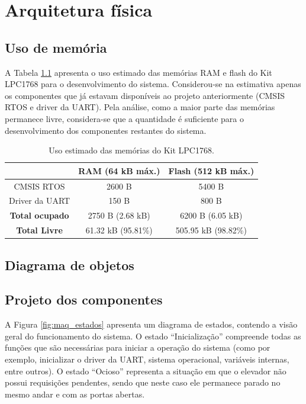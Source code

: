 \chapter{Arquitetura física}

\section{Uso de memória}

A Tabela \ref{tab:uso_memoria} apresenta o uso estimado das memórias RAM e flash do Kit LPC1768 para o desenvolvimento do sistema. Considerou-se na estimativa apenas os componentes que já estavam disponíveis ao projeto anteriormente (CMSIS RTOS e driver da UART). Pela análise, como a maior parte das memórias permanece livre, considera-se que a quantidade é suficiente para o desenvolvimento dos componentes restantes do sistema.

\begin{table}[h!]
	\caption{Uso estimado das memórias do Kit LPC1768.}
	\centering
	\begin{tabular}{|c|c|c|}
		\hline
		\textbf{} &\textbf{RAM (64 kB máx.)} & \textbf{Flash (512 kB máx.)} \\ \hline \hline
		CMSIS RTOS & 2600 B & 5400 B\\
		Driver da UART & 150 B & 800 B\\
		\hline
		\bf{Total ocupado} & 2750 B (2.68 kB) & 6200 B (6.05 kB)\\
		\bf{Total Livre} & 61.32 kB (95.81\%) & 505.95 kB (98.82\%) \\
		\hline
	\end{tabular}
	\label{tab:uso_memoria}
\end{table}


\section{Diagrama de objetos}



\section{Projeto dos componentes}

A Figura \ref{fig:maq_estados} apresenta um diagrama de estados, contendo a visão geral do funcionamento do sistema. O estado ``Inicialização'' compreende todas as funções que são necessárias para iniciar a operação do sistema (como por exemplo, inicializar o driver da UART, sistema operacional, variáveis internas, entre outros). O estado ``Ocioso'' representa a situação em que o elevador não possui requisições pendentes, sendo que neste caso ele permanece parado no mesmo andar e com as portas abertas. 

